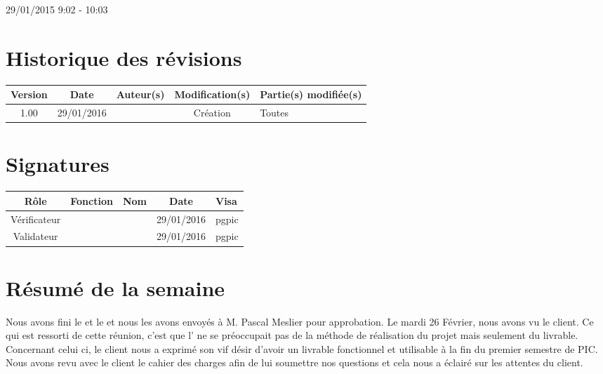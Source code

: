 \documentclass [a4paper] {article}
\begin{document}
29/01/2015			 				%
\hfill   
\hfill 	 9:02 - 10:03 				%


\section*{Historique des révisions}
\begin{center}
			\begin{tabular}{| c | c | c | c | p{4cm} |}
				\hline
				\rowcolor{Gray}
				Version & Date & Auteur(s) & Modification(s) & Partie(s) modifiée(s)		 \\
				\hline
				1.00 & 29/01/2016 & \Pierre & Création & Toutes \\
		\hline		
			\end{tabular}
		\end{center}

\section*{Signatures}

		\begin{center}
			\begin{tabular}{| c | c | c | c | p{4cm} |}
				\hline
				\rowcolor{Gray}
				Rôle & Fonction & Nom & Date & Visa		 \\
				\hline
				Vérificateur & \RQA & \Kafui & 29/01/2016 & pgpic \\[30pt]
				\hline
				Validateur & \CP & \Sergi & 29/01/2016 & pgpic \\[30pt]	
				\hline
			\end{tabular}
		\end{center}



\section{Résumé de la semaine}
Nous avons fini le \PQ{} et le \PGC{} et nous les avons envoyés à M. Pascal Meslier pour approbation.
Le mardi 26 Février, nous avons vu le client. Ce qui est ressorti de cette réunion, c'est que l'\nomClient{} ne se préoccupait pas de la méthode de réalisation du projet mais seulement du livrable. Concernant celui ci, le client nous a exprimé son vif désir d'avoir un livrable fonctionnel et utilisable à la fin du premier semestre de PIC.
\\
Nous avons revu avec le client le cahier des charges afin de lui soumettre nos questions et cela nous a éclairé sur les attentes du client.
\end{document}
